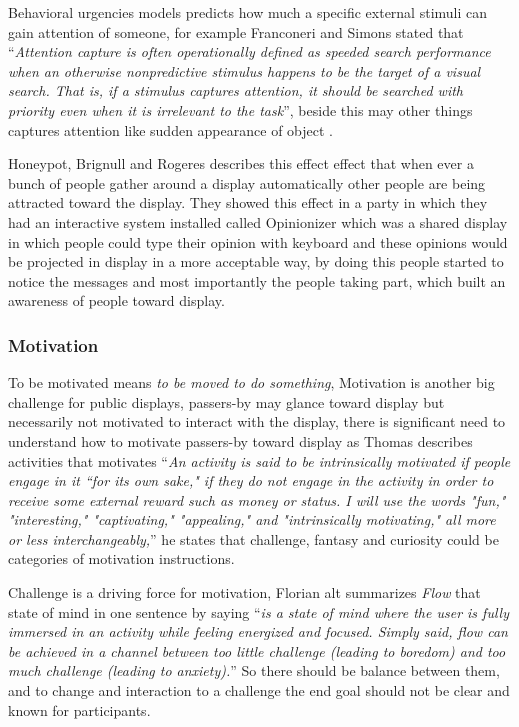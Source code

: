 Behavioral urgencies models predicts how much a specific external stimuli can gain attention of someone, for example Franconeri and Simons \cite{franconeri} stated that ``\emph{Attention capture is often operationally defined as speeded search performance when an otherwise nonpredictive stimulus happens to be the target of a visual search. That is, if a stimulus captures attention, it should be searched with priority even when it is irrelevant to the task}'', beside this may other things captures attention like sudden appearance of object \cite{capturingattention}.

Honeypot, Brignull and Rogeres \cite{EnticingPeople} describes this effect effect that when ever a bunch of people gather around a display automatically other people are being attracted toward the display. They showed this effect in a party in which they had an interactive system installed called Opinionizer which was a shared display in which people could type their opinion with keyboard and these opinions would be projected in display in a more acceptable way, by doing this people started to notice the messages and most importantly the people taking part, which built an awareness of people toward display. 

\subsubsection{Motivation}
To be motivated means \emph{to be moved to do something}\cite{motiv}, 
Motivation is another big challenge for public displays, passers-by may glance toward display but necessarily not motivated to interact with the display, there is significant need to understand how to motivate passers-by toward display as Thomas \cite{toward_motivation} describes activities that motivates ``\emph{An activity is said to be intrinsically motivated if people engage in it “for its own sake," if they do not engage in the activity in order to receive some external reward such as money or status. I will use the words "fun," "interesting," "captivating," "appealing," and "intrinsically motivating," all more or less interchangeably,}'' he states that challenge, fantasy and curiosity could be categories of motivation instructions.

Challenge is a driving force for motivation, Florian alt \cite{pervasiv_ad} summarizes \emph{Flow}\cite{flow} that state of mind in one sentence by saying ``\emph{is a state of mind where the user is fully immersed in an activity while feeling energized and focused. Simply said, flow can be achieved in a channel between too little challenge (leading to boredom) and too much challenge (leading to anxiety).}'' So there should be balance between them, and to change and interaction to a challenge the end goal should not be clear and known for participants.   

